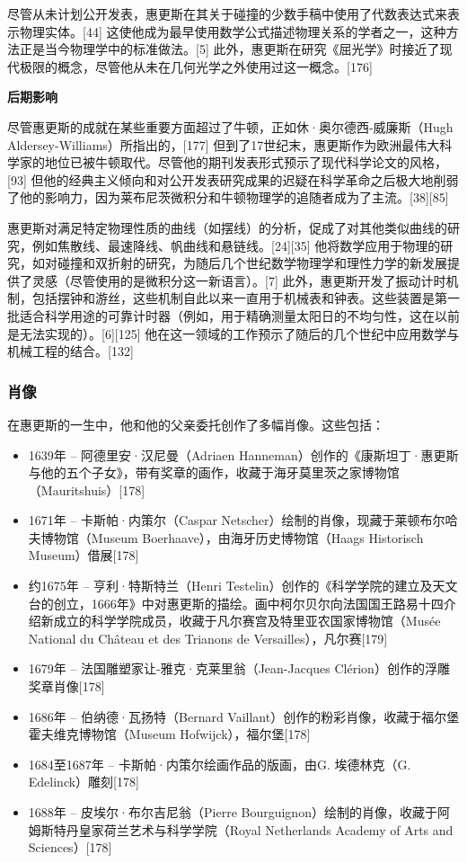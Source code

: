 尽管从未计划公开发表，惠更斯在其关于碰撞的少数手稿中使用了代数表达式来表示物理实体。[44] 这使他成为最早使用数学公式描述物理关系的学者之一，这种方法正是当今物理学中的标准做法。[5] 此外，惠更斯在研究《屈光学》时接近了现代极限的概念，尽管他从未在几何光学之外使用过这一概念。[176]

\textbf{后期影响}

尽管惠更斯的成就在某些重要方面超过了牛顿，正如休·奥尔德西-威廉斯（Hugh Aldersey-Williams）所指出的，[177] 但到了17世纪末，惠更斯作为欧洲最伟大科学家的地位已被牛顿取代。尽管他的期刊发表形式预示了现代科学论文的风格，[93] 但他的经典主义倾向和对公开发表研究成果的迟疑在科学革命之后极大地削弱了他的影响力，因为莱布尼茨微积分和牛顿物理学的追随者成为了主流。[38][85]

惠更斯对满足特定物理性质的曲线（如摆线）的分析，促成了对其他类似曲线的研究，例如焦散线、最速降线、帆曲线和悬链线。[24][35] 他将数学应用于物理的研究，如对碰撞和双折射的研究，为随后几个世纪数学物理学和理性力学的新发展提供了灵感（尽管使用的是微积分这一新语言）。[7] 此外，惠更斯开发了振动计时机制，包括摆钟和游丝，这些机制自此以来一直用于机械表和钟表。这些装置是第一批适合科学用途的可靠计时器（例如，用于精确测量太阳日的不均匀性，这在以前是无法实现的）。[6][125] 他在这一领域的工作预示了随后的几个世纪中应用数学与机械工程的结合。[132]

\subsubsection{肖像}
在惠更斯的一生中，他和他的父亲委托创作了多幅肖像。这些包括：

\begin{itemize}
\item 1639年 – 阿德里安·汉尼曼（Adriaen Hanneman）创作的《康斯坦丁·惠更斯与他的五个子女》，带有奖章的画作，收藏于海牙莫里茨之家博物馆（Mauritshuis）[178]
\item 1671年 – 卡斯帕·内策尔（Caspar Netscher）绘制的肖像，现藏于莱顿布尔哈夫博物馆（Museum Boerhaave），由海牙历史博物馆（Haags Historisch Museum）借展[178]
\item 约1675年 – 亨利·特斯特兰（Henri Testelin）创作的《科学学院的建立及天文台的创立，1666年》中对惠更斯的描绘。画中柯尔贝尔向法国国王路易十四介绍新成立的科学学院成员，收藏于凡尔赛宫及特里亚农国家博物馆（Musée National du Château et des Trianons de Versailles），凡尔赛[179]
\item 1679年 – 法国雕塑家让-雅克·克莱里翁（Jean-Jacques Clérion）创作的浮雕奖章肖像[178]
\item 1686年 – 伯纳德·瓦扬特（Bernard Vaillant）创作的粉彩肖像，收藏于福尔堡霍夫维克博物馆（Museum Hofwijck），福尔堡[178]
\item 1684至1687年 – 卡斯帕·内策尔绘画作品的版画，由G. 埃德林克（G. Edelinck）雕刻[178]
\item 1688年 – 皮埃尔·布尔吉尼翁（Pierre Bourguignon）绘制的肖像，收藏于阿姆斯特丹皇家荷兰艺术与科学学院（Royal Netherlands Academy of Arts and Sciences）[178]
\end{itemize}
